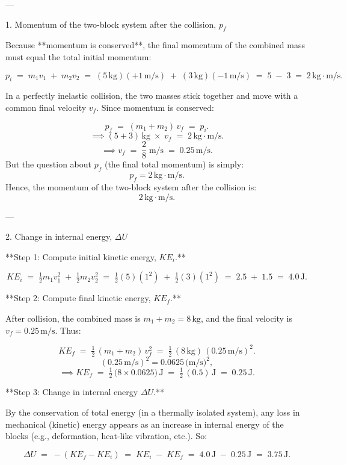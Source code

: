 \documentclass[12pt]{article}
\theoremstyle{definition} %
\theoremstyle{plain} %
\begin{document}
---

1. Momentum of the two-block system after the collision, \(p_f\)

Because **momentum is conserved**, the final momentum of the combined mass must equal the total initial momentum:

\[
p_i \;=\; m_1 v_1 \;+\; m_2 v_2 
\;=\; (5\,\mathrm{kg})(+1\,\mathrm{m/s})
\;+\; (3\,\mathrm{kg})(-1\,\mathrm{m/s})
\;=\; 5 \;-\; 3
\;=\; 2\,\mathrm{kg\cdot m/s}.
\]

In a perfectly inelastic collision, the two masses stick together and move with a common final velocity \(v_f\). Since momentum is conserved:

\[
p_f \;=\; (m_1 + m_2)\,v_f \;=\; p_i.
\]
\[
\implies (5 + 3)\,\mathrm{kg} \;\times\; v_f 
\;=\; 2\,\mathrm{kg\cdot m/s}.
\]
\[
\implies v_f 
\;=\; \frac{2}{8}\;\mathrm{m/s}
\;=\; 0.25\,\mathrm{m/s}.
\]
But the question about \(p_f\) (the final total momentum) is simply:
\[
p_f = 2\,\mathrm{kg\cdot m/s}.
\]
Hence, the momentum of the two-block system after the collision is:
\[
\boxed{2\,\mathrm{kg\cdot m/s}}.
\]

---

2. Change in internal energy, \(\Delta U\)

**Step 1: Compute initial kinetic energy, \(KE_i\).**

\[
KE_i 
\;=\; \tfrac{1}{2} m_1 v_1^2 \;+\;\tfrac{1}{2} m_2 v_2^2
\;=\; \tfrac{1}{2}(5)(1^2) \;+\; \tfrac{1}{2}(3)(1^2)
\;=\; 2.5 \;+\; 1.5
\;=\; 4.0\,\text{J}.
\]

**Step 2: Compute final kinetic energy, \(KE_f\).**

After collision, the combined mass is \(m_1 + m_2 = 8\,\text{kg}\), and the final velocity is \(v_f = 0.25\,\text{m/s}\). Thus:

\[
KE_f 
\;=\; \tfrac{1}{2}\,(m_1 + m_2)\,v_f^2
\;=\; \tfrac{1}{2}\,(8\,\text{kg})\,(0.25\,\text{m/s})^2.
\]
\[
(0.25\,\text{m/s})^2 = 0.0625\,\text{(m/s)}^2,
\]
\[
\implies KE_f
\;=\; \tfrac{1}{2}\,\bigl(8 \times 0.0625\bigr)\,\text{J}
\;=\; \tfrac{1}{2}\,(0.5)\,\text{J}
\;=\; 0.25\,\text{J}.
\]

**Step 3: Change in internal energy \(\Delta U\).**

By the conservation of total energy (in a thermally isolated system), any loss in mechanical (kinetic) energy appears as an increase in internal energy of the blocks (e.g., deformation, heat-like vibration, etc.). So:

\[
\Delta U 
\;=\; -(KE_f - KE_i) 
\;=\; KE_i \;-\; KE_f
\;=\; 4.0\,\text{J} \;-\; 0.25\,\text{J}
\;=\; 3.75\,\text{J}.
\]
\end{document}
